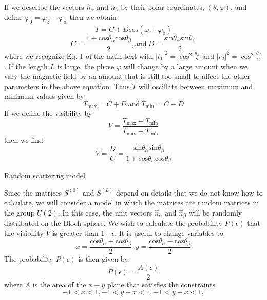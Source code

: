 \documentclass[%
reprint,amsmath,amssymb,aps,prl,superscriptaddress,
twocolumn
]{revtex4-1}
\begin{document}
		If we describe the vectors $\hat{n}_\alpha$ and $\hat{n}_\beta$ by their polar coordinates, $(\theta, \varphi)$, and define $\varphi_0 = \varphi_\beta - \varphi_\alpha$ then we obtain
		\begin{equation}
		T = C + D \mathrm{cos} (\varphi + \varphi_0)
		\label{eq:2p13}
		\end{equation}
		\begin{equation}
		C = \frac{1 + \mathrm{cos} \theta_\alpha \mathrm{cos} \theta_\beta}{2}, \mathrm{and}\
		D = \frac{\mathrm{sin} \theta_\alpha \mathrm{sin} \theta_\beta}{2}
		\end{equation}
		where we recognize Eq. 1 of the main text with $|t_1|^2 = \cos^2\frac{\theta_\alpha}{2}$ and $|r_2|^2 = \cos^2\frac{\theta_\beta}{2}$. If the length $L$ is large, the phase $\varphi$ will change by a large amount when we vary the magnetic field by an amount that is still too small to affect the other parameters in the above equation. Thus $T$ will oscillate between maximum and minimum values given by
		\begin{equation}
		T_\mathrm{max} = C+D \ \mathrm{and} \ T_\mathrm{min} = C-D
		\end{equation}
		If we define the visibility by
		\begin{equation}
		V = \frac{T_\mathrm{max}-T_\mathrm{min}}{T_\mathrm{max}+T_\mathrm{min}}
		\end{equation}
		then we find
		\begin{equation}
		V = \frac{D}{C} = \frac{\mathrm{sin}\theta_\alpha \mathrm{sin}\theta_\beta}{1+\mathrm{cos}\theta_\alpha \mathrm{cos}\theta_\beta}
		\end{equation}
		
		\noindent \underline{Random scattering model}
		
		Since the matrices $S^{(0)}$ and $S^{(L)}$ depend on details that we do not know how to calculate, we will consider a model in which the matrices are random matrices in the group $U(2)$. In this case, the unit vectors $\hat{n}_\alpha$ and  $\hat{n}_\beta$ will be randomly distributed on the Bloch sphere.
		We wish to calculate the probability $P(\epsilon)$ that the visibility $V$ is greater than 1 - $\epsilon$. It is useful to change variables to 
		\begin{equation}
		x = \frac{\mathrm{cos}\theta_\alpha+ \mathrm{cos}\theta_\beta}{2},
		y = \frac{\mathrm{cos}\theta_\alpha- \mathrm{cos}\theta_\beta}{2}
		\end{equation}
		The probability $P(\epsilon)$ is then given by:
		\begin{equation}
		P(\epsilon) = \frac{A(\epsilon)}{2}
		\end{equation}
		where $A$ is the area of the $x-y$ plane that satisfies the constraints
		\begin{equation}
		-1 < x < 1, -1 < y+x < 1, -1 < y-x < 1,
		\label{eq:constraints}
		\end{equation}
		
\end{document}

